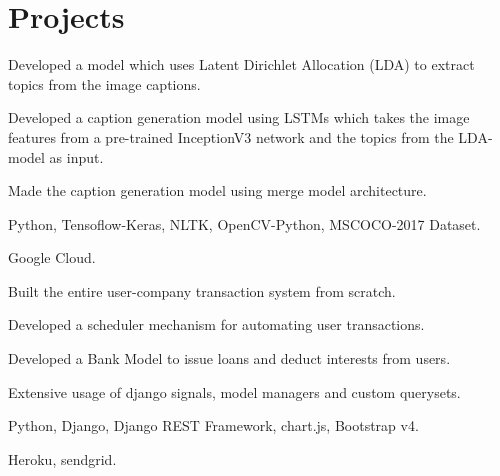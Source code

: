
\section{Projects}

\begin{tightemize}
\item Developed a model which uses Latent Dirichlet Allocation (LDA) to extract topics from the image captions.
\item Developed a caption generation model using LSTMs which takes the image features from a pre-trained InceptionV3 network and the topics from the LDA-model as input.
\item Made the caption generation model using merge model architecture.
\item {} Python, Tensoflow-Keras, NLTK, OpenCV-Python, MSCOCO-2017 Dataset.
\item {} Google Cloud.
\end{tightemize}
\sectionsep

\begin{tightemize}
\item Built the entire user-company transaction system from scratch.
\item Developed a scheduler mechanism for automating user transactions.
\item Developed a Bank Model to issue loans and deduct interests from users.
\item Extensive usage of django signals, model managers and custom querysets.
\item {} Python, Django, Django REST Framework, chart.js, Bootstrap v4.
\item {} Heroku, sendgrid.
\end{tightemize}
\sectionsep